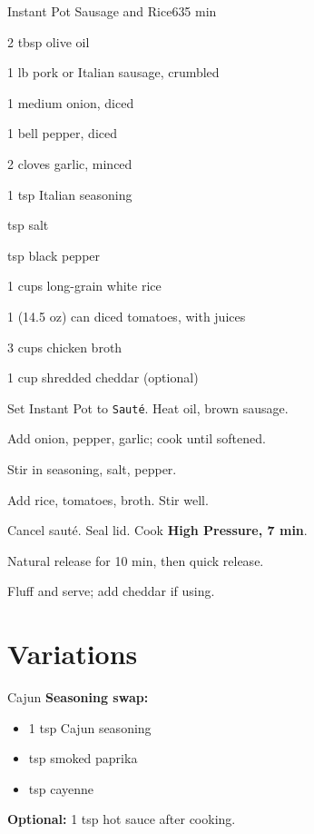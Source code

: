 \begin{recipebox}{Instant Pot Sausage and Rice}{6}{35 min}

\begin{ingredients}
  \item 2 tbsp olive oil
  \item 1 lb pork or Italian sausage, crumbled
  \item 1 medium onion, diced
  \item 1 bell pepper, diced
  \item 2 cloves garlic, minced
  \item 1 tsp Italian seasoning
  \item {} tsp salt
  \item {} tsp black pepper
  \item 1 cups long-grain white rice
  \item 1 (14.5 oz) can diced tomatoes, with juices
  \item 3 cups chicken broth
  \item 1 cup shredded cheddar (optional)
\end{ingredients}

\begin{method}
  \item Set Instant Pot to \texttt{Sauté}. Heat oil, brown sausage.
  \item Add onion, pepper, garlic; cook until softened.
  \item Stir in seasoning, salt, pepper.
  \item Add rice, tomatoes, broth. Stir well.
  \item Cancel sauté. Seal lid. Cook \textbf{High Pressure, 7 min}.
  \item Natural release for 10 min, then quick release.
  \item Fluff and serve; add cheddar if using.
\end{method}

\section*{Variations}

\begin{variationbox}{Cajun}
  \textbf{Seasoning swap:}
  \begin{itemize}
    \item 1 tsp Cajun seasoning
    \item {} tsp smoked paprika
    \item {} tsp cayenne
  \end{itemize}
  \textbf{Optional:} 1 tsp hot sauce after cooking.
\end{variationbox}


\end{recipebox}
